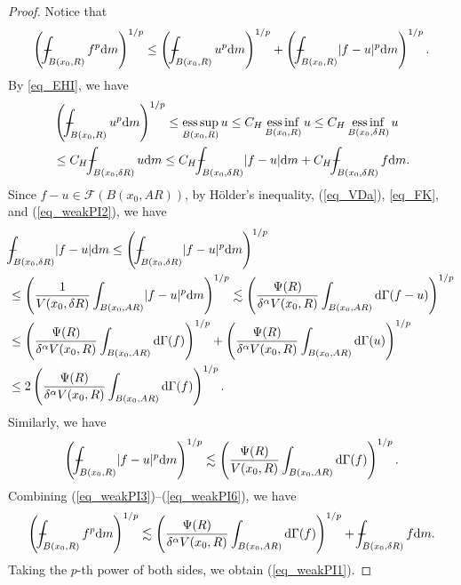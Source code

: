 \documentclass[11pt,a4paper]{article}
\numberwithin{equation}{section}
\newcommand{\esup}{\operatorname*{ess\,sup}}
\newcommand{\einf}{\operatorname*{ess\,inf}}
\def\Xint#1{\mathchoice
{\XXint\displaystyle\textstyle{#1}}%
{\XXint\textstyle\scriptstyle{#1}}%
{\XXint\scriptstyle\scriptscriptstyle{#1}}%
{\XXint\scriptscriptstyle\scriptscriptstyle{#1}}%
\!\int}
\def\XXint#1#2#3{{\setbox0=\hbox{$#1{#2#3}{\int}$ }
\vcenter{\hbox{$#2#3$ }}\kern-.6\wd0}}
\def\dashint{\Xint-}
\theoremstyle{plain}
\theoremstyle{definition}
\begin{document}
\begin{proof}
Notice that
\begin{align}
\left(\dashint_{B(x_0,R)}f^p \mathrm{d}m\right)^{1/p}\le \left(\dashint_{B(x_0,R)} u^p \mathrm{d}m\right)^{1/p}+\left(\dashint_{B(x_0,R)}\lvert f-u\rvert^p \mathrm{d}m\right)^{1/p}.\label{eq_weakPI3}
\end{align}
By \ref{eq_EHI}, we have
\begin{align}
&\left(\dashint_{B(x_0,R)} u^p \mathrm{d}m\right)^{1/p}\le \esup_{B(x_0,R)} u\le C_H \einf_{B(x_0,R)}u\le C_H \einf_{B(x_0,\delta R)}u\nonumber\\
&\le C_H \dashint_{B(x_0,\delta R)}u \mathrm{d}m\le C_H\dashint_{B(x_0,\delta R)}\lvert f-u\rvert \mathrm{d}m+C_H\dashint_{B(x_0,\delta R)}f \mathrm{d}m.\label{eq_weakPI4}
\end{align}
Since $f-u\in \mathcal{F}(B(x_0,AR))$, by H\"older's inequality, (\ref{eq_VDa}), \ref{eq_FK}, and (\ref{eq_weakPI2}), we have
\begin{align}
&\dashint_{B(x_0,\delta R)}\lvert f-u\rvert \mathrm{d}m\le \left(\dashint_{B(x_0,\delta R)}\lvert f-u\rvert^p \mathrm{d}m\right)^{1/p}\nonumber\\
&\le\left(\frac{1}{V(x_0,\delta R)}\int_{B(x_0,A R)}\lvert f-u\rvert^p \mathrm{d}m\right)^{1/p}\lesssim \left(\frac{\Psi(R)}{\delta^{\alpha}V(x_0,R)}\int_{B(x_0,AR)}\mathrm{d}\Gamma(f-u)\right)^{1/p}\nonumber\\
&\le \left(\frac{\Psi(R)}{\delta^{\alpha}V(x_0,R)}\int_{B(x_0,AR)}\mathrm{d}\Gamma(f)\right)^{1/p}+\left(\frac{\Psi(R)}{\delta^{\alpha}V(x_0,R)}\int_{B(x_0,AR)}\mathrm{d}\Gamma(u)\right)^{1/p}\nonumber\\
&\le2\left(\frac{\Psi(R)}{\delta^{\alpha}V(x_0,R)}\int_{B(x_0,AR)}\mathrm{d}\Gamma(f)\right)^{1/p}.\label{eq_weakPI5}
\end{align}
Similarly, we have
\begin{equation}\label{eq_weakPI6}
\left(\dashint_{B(x_0,R)}\lvert f-u\rvert^p \mathrm{d}m\right)^{1/p}\lesssim \left(\frac{\Psi(R)}{V(x_0,R)}\int_{B(x_0,AR)}\mathrm{d}\Gamma(f)\right)^{1/p}.
\end{equation}
Combining (\ref{eq_weakPI3})--(\ref{eq_weakPI6}), we have
\begin{equation*}
\left(\dashint_{B(x_0,R)}f^p \mathrm{d}m\right)^{1/p}\lesssim \left(\frac{\Psi(R)}{\delta^{\alpha}V(x_0,R)}\int_{B(x_0,AR)}\mathrm{d}\Gamma(f)\right)^{1/p}+\dashint_{B(x_0,\delta R)}f \mathrm{d}m.
\end{equation*}
Taking the $p$-th power of both sides, we obtain (\ref{eq_weakPI1}).


\end{proof}
\end{document}
